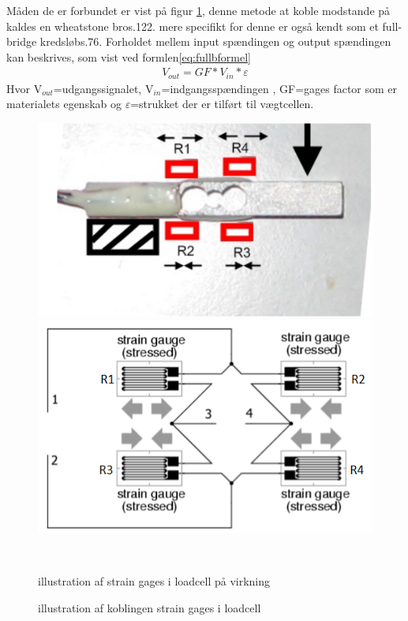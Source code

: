  Måden de er forbundet er vist på figur \ref{fig:loadcell2}, denne metode at koble modstande på kaldes en wheatstone bro\citep{ELengbog}{s.122}. mere specifikt for denne er også kendt som et full-bridge kredsløb\citep{AETbog}{s.76}. Forholdet mellem input spændingen og output spændingen kan beskrives, som vist ved formlen\ref{eq:fullbformel}
\begin{align}
 V_{out}=GF*V_{in}*\varepsilon
 \label{eq:fullbformel}
 \end{align}
 Hvor V$_{out}$=udgangssignalet, V$_{in}$=indgangsspændingen , GF=gages factor som er materialets egenskab og $\varepsilon$=strukket der er tilført til vægtcellen.

\begin{figure}[htbp] \centering
\begin{minipage}[b]{0.48\textwidth} \centering
\includegraphics[width=1.00\textwidth]{billeder/Hardware/loadcell1.PNG} %
\end{minipage} \hfill
\begin{minipage}[b]{0.48\textwidth} \centering
\includegraphics[width=1.00\textwidth]{billeder/Hardware/straingages2.PNG} %
\end{minipage} \\ %
\begin{minipage}[t]{0.48\textwidth}
\caption{illustration af strain gages i loadcell på virkning} %
\label{fig:Loadcell1}
\end{minipage} \hfill
\begin{minipage}[t]{0.48\textwidth}
\caption{illustration af koblingen strain gages i loadcell} %
\label{fig:loadcell2}
\end{minipage}
\end{figure}
